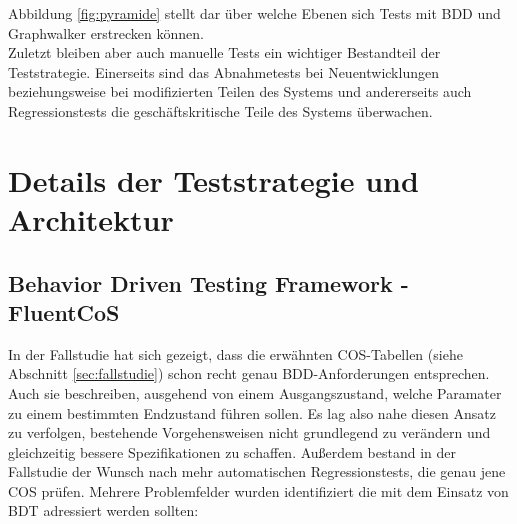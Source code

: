 Abbildung \ref{fig:pyramide} stellt dar über welche Ebenen sich Tests mit \Gls{BDD} und Graphwalker erstrecken können.\\
Zuletzt bleiben aber auch manuelle Tests ein wichtiger Bestandteil der Teststrategie. Einerseits sind das Abnahmetests bei Neuentwicklungen beziehungsweise bei modifizierten Teilen des Systems und andererseits auch Regressionstests die geschäftskritische Teile des Systems überwachen.

\section{Details der Teststrategie und Architektur}
\label{sec:details}


\subsection{Behavior Driven Testing Framework - FluentCoS}
\label{sec:fluent_cos}
In der Fallstudie hat sich gezeigt, dass die erwähnten \Gls{COS}-Tabellen (siehe Abschnitt \ref{sec:fallstudie}) schon recht genau \Gls{BDD}-Anforderungen entsprechen. Auch sie beschreiben, ausgehend von einem Ausgangszustand, welche Paramater zu einem bestimmten Endzustand führen sollen. Es lag also nahe diesen Ansatz zu verfolgen, bestehende Vorgehensweisen nicht grundlegend zu verändern und gleichzeitig bessere Spezifikationen zu schaffen. Außerdem bestand in der Fallstudie der Wunsch nach mehr automatischen Regressionstests, die genau jene \Gls{COS} prüfen. Mehrere Problemfelder wurden identifiziert die mit dem Einsatz von \Gls{BDT} adressiert werden sollten:

